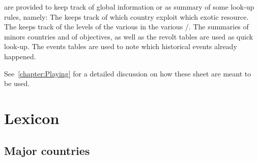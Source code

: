  are provided to keep track of global information
or as summary of some look-up rules, namely:
\bparag The  keeps track of which country
exploit which exotic resource.
\bparag The  keeps track of the levels of the various
\TradeFLEET in the various \STZ/\CTZ.
\bparag The summaries of minors countries and of objectives, as well as the
revolt tables are used as quick look-up.
\bparag The events tables are used to note which historical events already
happened.

\aparag See~\ref{chapter:Playing} for a detailed discussion on how these sheet
are meant to be used.




\section{Lexicon}




\subsection{Major countries}

